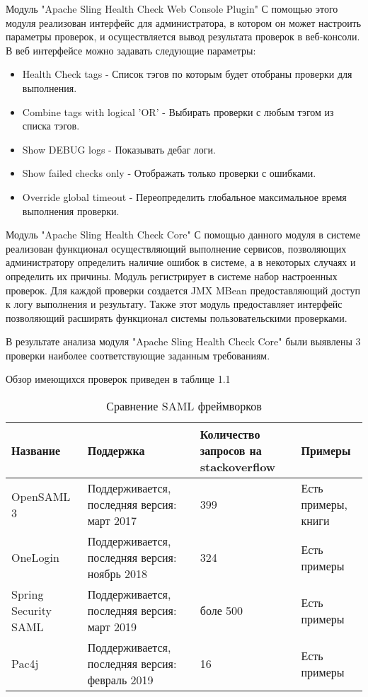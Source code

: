 Модуль "Apache Sling Health Check Web Console Plugin"
	С помощью этого модуля реализован интерфейс для администратора, в котором он может настроить параметры проверок, и осуществляется вывод результата проверок в веб-консоли. В веб интерфейсе можно задавать следующие параметры:
\begin{itemize}
\item Health Check tags - Список тэгов по которым будет отобраны проверки для выполнения.
\item Combine tags with logical 'OR' - Выбирать проверки с любым тэгом из списка тэгов.
\item Show DEBUG logs - Показывать дебаг логи.
\item Show failed checks only - Отображать только проверки с ошибками.
\item Override global timeout - Переопределить глобальное максимальное время выполнения проверки.
\end{itemize}

Модуль "Apache Sling Health Check Core"
	С помощью данного модуля в системе реализован функционал осуществляющий выполнение сервисов, позволяющих администратору определить наличие ошибок в системе, а в некоторых случаях и определить их причины. Модуль регистрирует в системе набор настроенных проверок. Для каждой проверки создается JMX MBean предоставляющий доступ к логу выполнения и результату. Также этот модуль предоставляет интерфейс позволяющий расширять функционал системы пользовательскими проверками. 
	 
	В результате анализа модуля "Apache Sling Health Check Core" были выявлены 3 проверки наиболее соответствующие заданным требованиям.
	
	Обзор имеющихся проверок приведен в таблице 1.1
		
\begin{table}[ht]
  \caption{Сравнение SAML \cite{web:wikiSaml} фреймворков}
  \begin{tabular}{|p{3cm}|p{47mm}|p{30mm}|p{35mm}|}
  \hline
  Название      
  & Поддержка 
  & Количество запросов на stackoverflow 
  & Примеры \\
  \hline
  OpenSAML 3  
  & Поддерживается, последняя версия: март 2017
  & 399
  & Есть примеры, книги \\
  \hline
  OneLogin       			   
  & Поддерживается, последняя версия: ноябрь 2018
  & 324
  & Есть примеры \\
  \hline
  Spring Security SAML                
  & Поддерживается, последняя версия: март 2019
  & боле 500
  & Есть примеры \\
  \hline
  Pac4j       			   
  & Поддерживается, последняя версия: февраль 2019
  & 16
  & Есть примеры \\
  \hline
  \end{tabular}
  \label{tab:tabular}
\end{table}	
	
